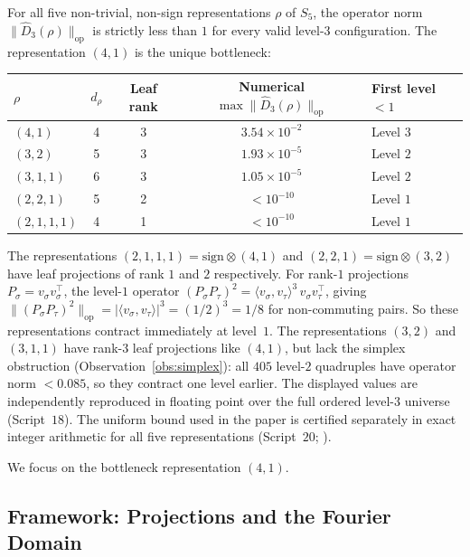 \documentclass[version=final]{iacrcc}
\newcommand{\norm}[1]{\lVert #1 \rVert}
\newcommand{\abs}[1]{\lvert #1 \rvert}
\newcommand{\opn}[1]{\norm{#1}_{\mathrm{op}}}
\newcommand{\Dhat}{\widehat{D}}
\begin{document}
\begin{proposition}
\label{prop:other_reps}
For all five non-trivial, non-sign representations $\rho$ of $S_5$, the
operator norm $\opn{\Dhat_3(\rho)}$ is strictly less than $1$ for every
valid level-$3$ configuration. The representation $(4,1)$ is the unique
bottleneck:
\begin{center}
\begin{tabular}{lcccl}
\toprule
$\rho$ & $d_\rho$ & Leaf rank & Numerical $\max\opn{\Dhat_3(\rho)}$ & First level $< 1$ \\
\midrule
$(4,1)$     & 4 & 3 & $3.54 \times 10^{-2}$ & Level $3$ \\
$(3,2)$     & 5 & 3 & $1.93 \times 10^{-5}$ & Level $2$ \\
$(3,1,1)$   & 6 & 3 & $1.05 \times 10^{-5}$ & Level $2$ \\
$(2,2,1)$   & 5 & 2 & $< 10^{-10}$          & Level $1$ \\
$(2,1,1,1)$ & 4 & 1 & $< 10^{-10}$          & Level $1$ \\
\bottomrule
\end{tabular}
\end{center}
The representations $(2,1,1,1) = \mathrm{sign} \otimes (4,1)$ and
$(2,2,1) = \mathrm{sign} \otimes (3,2)$ have leaf projections of rank $1$
and $2$ respectively.  For rank-$1$ projections $P_\sigma = v_\sigma v_\sigma^\top$,
the level-$1$ operator $(P_\sigma P_\tau)^2 = \langle v_\sigma, v_\tau \rangle^3
\, v_\sigma v_\tau^\top$, giving
$\opn{(P_\sigma P_\tau)^2} = \abs{\langle v_\sigma, v_\tau \rangle}^3 = (1/2)^3 = 1/8$
for non-commuting pairs.  So these representations contract immediately at level~$1$. The representations $(3,2)$ and $(3,1,1)$
have rank-$3$ leaf projections like $(4,1)$, but lack the simplex
obstruction (Observation~\ref{obs:simplex}): all $405$ level-$2$ quadruples have
operator norm $< 0.085$, so they contract one level earlier.
The displayed values are independently reproduced in floating point over the
full ordered level-$3$ universe (Script~$18$). The uniform bound used in the
paper is certified separately in exact integer arithmetic for all five
representations (Script~$20$; ).
\end{proposition}

We focus on the bottleneck representation $(4,1)$.


\subsection{Framework: Projections and the Fourier Domain}
\label{sec:framework}
\end{document}
